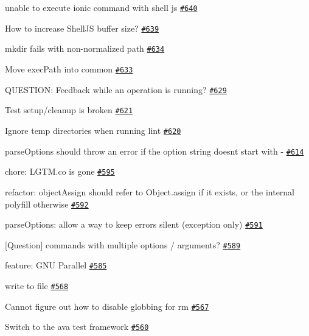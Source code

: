 \begin{DoxyItemize}
\item unable to execute ionic command with shell js \href{https://github.com/shelljs/shelljs/issues/640}{\tt \#640}
\item How to increase Shell\+JS buffer size? \href{https://github.com/shelljs/shelljs/issues/639}{\tt \#639}
\item mkdir fails with non-\/normalized path \href{https://github.com/shelljs/shelljs/issues/634}{\tt \#634}
\item Move exec\+Path into common \href{https://github.com/shelljs/shelljs/issues/633}{\tt \#633}
\item Q\+U\+E\+S\+T\+I\+ON\+: Feedback while an operation is running? \href{https://github.com/shelljs/shelljs/issues/629}{\tt \#629}
\item Test setup/cleanup is broken \href{https://github.com/shelljs/shelljs/issues/621}{\tt \#621}
\item Ignore temp directories when running lint \href{https://github.com/shelljs/shelljs/issues/620}{\tt \#620}
\item parse\+Options should throw an error if the option string doesn\textquotesingle{}t start with \textquotesingle{}-\/\textquotesingle{} \href{https://github.com/shelljs/shelljs/issues/614}{\tt \#614}
\item chore\+: L\+G\+T\+M.\+co is gone \href{https://github.com/shelljs/shelljs/issues/595}{\tt \#595}
\item refactor\+: object\+Assign should refer to Object.\+assign if it exists, or the internal polyfill otherwise \href{https://github.com/shelljs/shelljs/issues/592}{\tt \#592}
\item parse\+Options\+: allow a way to keep errors silent (exception only) \href{https://github.com/shelljs/shelljs/issues/591}{\tt \#591}
\item \mbox{[}Question\mbox{]} commands with multiple options / arguments? \href{https://github.com/shelljs/shelljs/issues/589}{\tt \#589}
\item feature\+: G\+NU Parallel \href{https://github.com/shelljs/shelljs/issues/585}{\tt \#585}
\item write to file \href{https://github.com/shelljs/shelljs/issues/568}{\tt \#568}
\item Cannot figure out how to disable globbing for rm \href{https://github.com/shelljs/shelljs/issues/567}{\tt \#567}
\item Switch to the ava test framework \href{https://github.com/shelljs/shelljs/issues/560}{\tt \#560}

\end{DoxyItemize}
